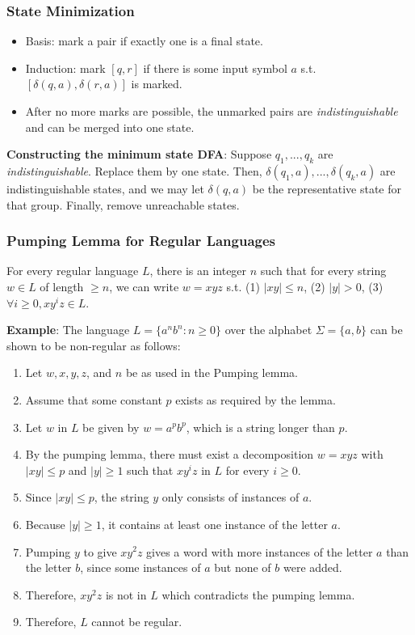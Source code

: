 \subsubsection{State Minimization}
\begin{itemize}
    \item Basis: mark a pair if exactly one is a final state. 
\item Induction: mark $[q,r]$ if there is some input symbol $a$ s.t. $[\delta(q, a) , \delta(r,a )]$ is marked. 
\item After no more marks are possible, the unmarked pairs are \textit{indistinguishable} and can be merged into one state. 
\end{itemize}
\textbf{Constructing the minimum state DFA}:
Suppose $q_1 ,..., q_k$ are \textit{indistinguishable}. Replace them by one state. Then, $\delta(q_1, a) ,..., \delta(q_k, a)$ are indistinguishable states, and we may let $\delta(q, a)$ be the representative state for that group. Finally, remove unreachable states. 


\subsubsection{Pumping Lemma for Regular Languages}
For every regular language $L$, there is an integer $n$ such that for every string $w \in L$ of length $\geq n$, we can write $w = xyz$ s.t. (1) $|xy| \leq n$, (2) $|y|> 0$, (3) $\forall i \geq 0, x y^iz \in L$.

\textbf{Example}: The language $L = \{a^n b^n : n \geq 0\}$ over the alphabet $\Sigma = \{a, b\}$ can be shown to be non-regular as follows:
\begin{enumerate}
\item Let $w, x, y, z$, and $n$ be as used in the Pumping lemma. 
\item Assume that some constant $p$ exists as required by the lemma. 
\item Let $w$ in $L$ be given by $w = a^p b^p$, which is a string longer than $p$. 
\item By the pumping lemma, there must exist a decomposition $w = xyz$ with $|xy| \leq p$ and $|y| \geq 1$ such that $xy^iz$ in $L$ for every $i \geq 0$. 
\item Since $|xy| \leq p$, the string $y$ only consists of instances of $a$.  
\item Because $|y| \geq 1$, it contains at least one instance of the letter $a$. 
\item Pumping $y$ to give $xy^2z$ gives a word with more instances of the letter $a$ than the letter $b$, since  some instances of $a$ but none of $b$ were added. 
\item Therefore, $xy^2z$ is not in $L$ which contradicts the pumping lemma.
\item Therefore, $L$ cannot be regular.
\end{enumerate}
